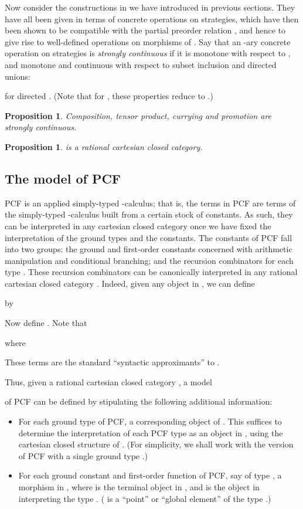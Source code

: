 \documentclass[11pt]{article}
\newtheorem{proposition}[theorem]{Proposition}
\begin{document}
Now consider the constructions in   we have introduced in previous
sections. They have all been given in terms of concrete operations
on strategies,
which have then been shown to be compatible with the partial preorder
relation , and hence to give rise to well-defined operations
on morphisms of .
Say that an -ary concrete operation  on strategies is
{\em strongly continuous} if it is monotone with respect to ,
and monotone
and continuous with respect to subset inclusion and directed unions:

for directed .
(Note that for , these properties reduce to .)

\begin{proposition}
Composition, tensor product, currying and promotion
are strongly continuous.
\end{proposition}

\begin{proposition}\label{229}
 is a rational cartesian closed category.
\end{proposition}

\subsection{The model of PCF}

PCF is an applied simply-typed -calculus; that is, the terms in PCF are
terms of the simply-typed -calculus built from a certain
stock of constants.
As such, they can be interpreted in any cartesian closed category once we have
fixed the interpretation of the ground types and the constants.
The constants of PCF fall into two groups: the ground and first-order constants
concerned with arithmetic manipulation and conditional branching;
and the recursion combinators
  for each type .
These recursion combinators can be canonically interpreted in any rational
cartesian closed category .
Indeed, given any object  in , we can define

by

Now define .
Note that

where

These terms  are the standard ``syntactic approximants''
to .


Thus, given a rational cartesian closed category , a model

of PCF can be defined by stipulating the following additional information:
\begin{itemize}
\item For each ground type of PCF, a corresponding object
of . This suffices to determine the interpretation of each
PCF type  as an object in , using the cartesian closed structure
of .
(For simplicity, we shall work with the version of PCF with a single ground
type .)
\item For each ground constant  and first-order function of PCF,
say of type ,
a morphism  in , where 
is the terminal object in , and  is the object in 
interpreting the type . ( is a ``point'' or ``global element'' of the
type .)
\end{itemize}
\end{document}
